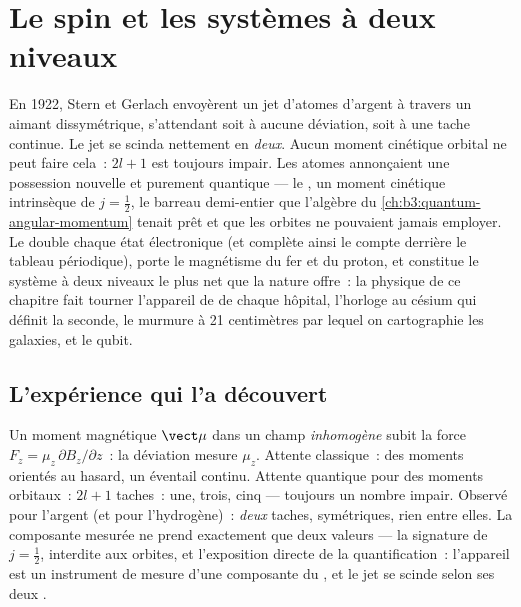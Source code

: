 \chapter{Le spin et les systèmes à deux niveaux}\label{ch:b3:spin-two-level}

En 1922, Stern et Gerlach envoyèrent un jet d'atomes d'argent à
travers un aimant dissymétrique, s'attendant soit à aucune déviation,
soit à une tache continue. Le jet se scinda nettement en \emph{deux}.
Aucun moment cinétique orbital ne peut faire cela~: $2l + 1$ est
toujours impair. Les atomes annonçaient une possession nouvelle et
purement quantique --- le \emph{}, un moment cinétique intrinsèque
de $j = \tfrac12$, le barreau demi-entier que l'algèbre du
\cref{ch:b3:quantum-angular-momentum} tenait prêt et que les orbites ne
pouvaient jamais employer. Le  double chaque état électronique (et
complète ainsi le compte derrière le tableau périodique), porte le
magnétisme du fer et du proton, et constitue le système à deux niveaux
le plus net que la nature offre~: la physique de ce chapitre fait
tourner l'appareil de  de chaque hôpital,
l'horloge au césium qui définit la seconde, le murmure à
21 centimètres par lequel on cartographie les galaxies, et le qubit.

\section{L'expérience qui l'a découvert}

\begin{example}\label{ex:b3:spin-two-level:stern-gerlach}
Un moment magnétique $\vect\mu$ dans un champ \emph{inhomogène} subit
la force $F_z = \mu_z\,\partial B_z/\partial z$~: la déviation mesure
$\mu_z$. Attente classique~: des moments orientés au hasard, un
éventail continu. Attente quantique pour des moments orbitaux~:
$2l + 1$ taches~: une, trois, cinq --- toujours un nombre impair.
Observé pour l'argent (et pour l'hydrogène)~: \emph{deux} taches,
symétriques, rien entre elles. La composante mesurée ne prend
exactement que deux valeurs --- la signature de $j
= \tfrac12$, interdite aux orbites, et l'exposition directe de la
quantification~: l'appareil est un instrument de mesure d'une
composante du , et le jet se scinde selon ses deux .
\end{example}

